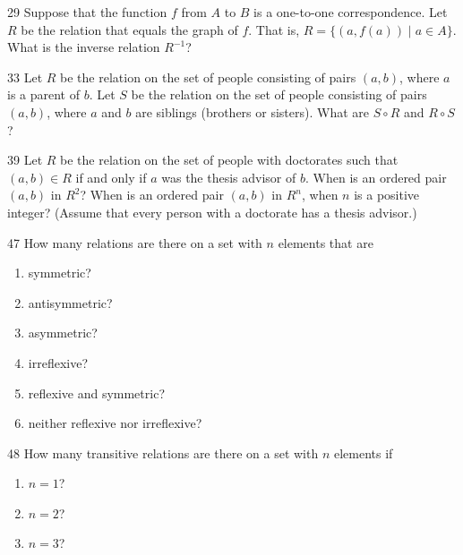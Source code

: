 \documentclass[11pt]{article}
\begin{document}
\begin{exercise}{29}
    Suppose that the function $f$ from $A$ to $B$ is a one-to-one
    correspondence. Let $R$ be the relation that equals the graph of
    $f$. That is, $R = \{(a, f(a)) \mid a \in A\}$. What is the
    inverse relation $R^{-1}$?
\end{exercise}

\begin{exercise}{33}
    Let $R$ be the relation on the set of people consisting of pairs
    $(a,b)$, where $a$ is a parent of $b$. Let $S$ be the relation on
    the set of people consisting of pairs $(a,b)$, where $a$ and $b$
    are siblings (brothers or sisters). What are $S \circ R$ and
    $R \circ S$?
\end{exercise}

\begin{exercise}{39}
    Let $R$ be the relation on the set of people with doctorates such
    that $(a,b) \in R$ if and only if $a$ was the thesis advisor of
    $b$. When is an ordered pair $(a,b)$ in $R^2$? When is an ordered
    pair $(a,b)$ in $R^n$, when $n$ is a positive integer? (Assume
    that every person with a doctorate has a thesis advisor.)
\end{exercise}


\begin{exercise}{47}
    How many relations are there on a set with $n$ elements that are
    \begin{enumerate}[label=(\alph*)]
        \item symmetric?
        \item antisymmetric?
        \item asymmetric?
        \item irreflexive?
        \item reflexive and symmetric?
        \item neither reflexive nor irreflexive?
    \end{enumerate}
\end{exercise}

\begin{exercise}{48}
    How many transitive relations are there on a set with $n$
    elements if
    \begin{enumerate}[label=(\alph*)]
        \item $n=1$?
        \item $n=2$?
        \item $n=3$?
    \end{enumerate}
\end{exercise}
\end{document}
